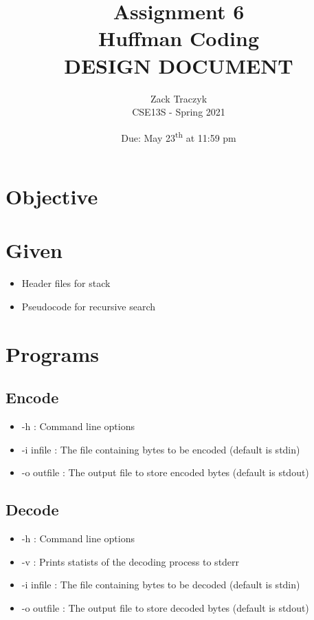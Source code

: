 \documentclass[12pt]{article}
\title{%
    \textbf{Assignment 6 \\ 
        Huffman Coding \\
\large DESIGN DOCUMENT} }
\author{Zack Traczyk \\ CSE13S - Spring 2021}
\date{Due: May 23\textsuperscript{th} at 11:59 pm}
\begin{document}
\maketitle

\section{Objective}


\section{Given}

\begin{itemize}
    \item{Header files for stack}
    \item{Pseudocode for recursive search}
\end{itemize}


\section{Programs}

\subsection{Encode}

\begin{itemize}
    \item{-h : Command line options}
    \item{-i infile : The file containing bytes to be encoded (default is stdin)}
    \item{-o outfile : The output file to store encoded bytes (default is stdout)}
\end{itemize}

\subsection{Decode}

\begin{itemize}
    \item{-h : Command line options }
    \item{-v : Prints statists of the decoding process to stderr}
    \item{-i infile : The file containing bytes to be decoded (default is stdin)}
    \item{-o outfile : The output file to store decoded bytes (default is stdout)}
\end{itemize}
\end{document}
